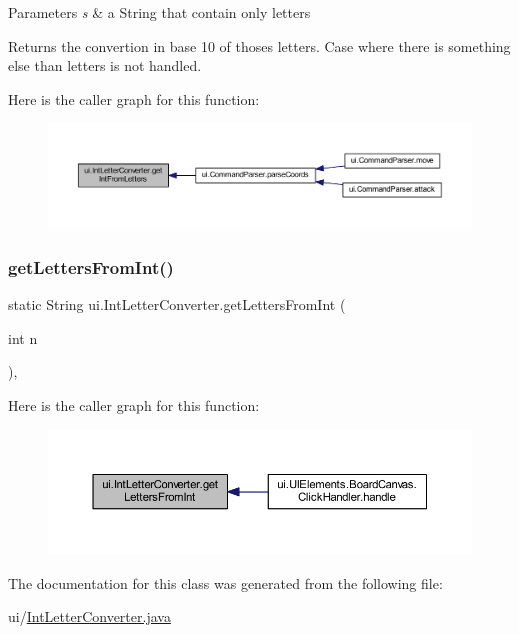 \begin{DoxyParams}{Parameters}
{\em s} & a String that contain only letters \\
\hline
\end{DoxyParams}
\begin{DoxyReturn}{Returns}
the convertion in base 10 of thoses letters. Case where there is something else than letters is not handled. 
\end{DoxyReturn}
Here is the caller graph for this function\+:
\nopagebreak
\begin{figure}[H]
\begin{center}
\leavevmode
\includegraphics[width=350pt]{classui_1_1_int_letter_converter_adb6e9cbdedba0aaa6960c395bdb4f236_icgraph}
\end{center}
\end{figure}
\mbox{\label{classui_1_1_int_letter_converter_a2a4cfa28ca741286cc55ce2b5bd260c8}} 
\subsubsection{\texorpdfstring{get\+Letters\+From\+Int()}{getLettersFromInt()}}
{\footnotesize\ttfamily static String ui.\+Int\+Letter\+Converter.\+get\+Letters\+From\+Int (\begin{DoxyParamCaption}\item[{int}]{n }\end{DoxyParamCaption})\hspace{0.3cm}{\ttfamily [inline]}, {\ttfamily [static]}}

Here is the caller graph for this function\+:
\nopagebreak
\begin{figure}[H]
\begin{center}
\leavevmode
\includegraphics[width=350pt]{classui_1_1_int_letter_converter_a2a4cfa28ca741286cc55ce2b5bd260c8_icgraph}
\end{center}
\end{figure}


The documentation for this class was generated from the following file\+:\begin{DoxyCompactItemize}
\item 
ui/\mbox{\hyperlink{_int_letter_converter_8java}{Int\+Letter\+Converter.\+java}}\end{DoxyCompactItemize}
